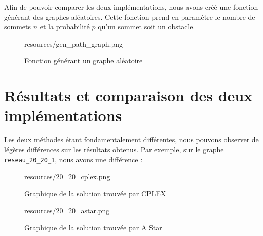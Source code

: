 Afin de pouvoir comparer les deux implémentations, nous avons créé une fonction générant des graphes aléatoires. Cette fonction prend en paramètre le nombre de sommets $n$ et la probabilité $p$ qu'un sommet soit un obstacle.

\begin{figure}[H]
    \centering
    \begin{includegraphics}[width=1\textwidth]{resources/gen_path_graph.png}
    \end{includegraphics}
    \caption{Fonction générant un graphe aléatoire}
    \label{fig:gen_path_graph}
\end{figure}

\section{Résultats et comparaison des deux implémentations}
\label{sec:shortest_path_comparison}

Les deux méthodes étant fondamentalement différentes, nous pouvons observer de légères différences sur les résultats obtenus. Par exemple, sur le graphe \texttt{reseau\_20\_20\_1}, nous avons une différence :

\begin{figure}[H]
    \centering
    \begin{includegraphics}[width=.6\textwidth]{resources/20_20_cplex.png}
    \end{includegraphics}
    \caption{Graphique de la solution trouvée par CPLEX}
    \label{fig:cplex_2020}
\end{figure}

\begin{figure}[H]
    \centering
    \begin{includegraphics}[width=.6\textwidth]{resources/20_20_astar.png}
    \end{includegraphics}
    \caption{Graphique de la solution trouvée par A Star}
    \label{fig:astar_2020}
\end{figure}